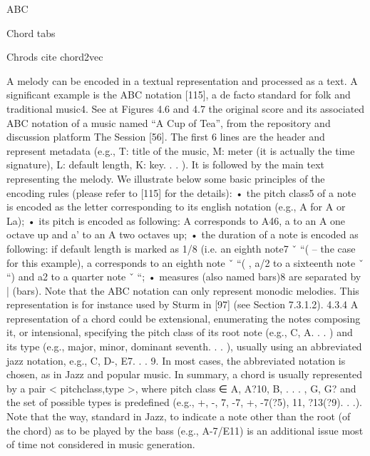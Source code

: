 ABC \cite{Sturm2015}

Chord tabs

Chrods cite chord2vec

A melody can be encoded in a textual representation and processed as a text. A significant example is the ABC notation [115], a de facto standard for folk and traditional music4. See at Figures 4.6 and 4.7 the original score and its associated ABC notation of a music named “A Cup of Tea”, from the repository and discussion platform The Session [56]. The first 6 lines are the header and represent metadata (e.g., T: title of the music, M:
meter (it is actually the time signature), L: default length, K: key. . . ). It is followed by the main text representing the melody. We illustrate below some basic principles of the encoding rules (please refer to [115] for the details):
• the pitch class5 of a note is encoded as the letter corresponding to its english notation (e.g., A for A or La);
• its pitch is encoded as following: A corresponds to A46, a to an A one octave up and a’ to an A two octaves up;
• the duration of a note is encoded as following: if default length is marked as 1/8 (i.e. an eighth note7
ˇ “( – the case for this example), a corresponds to an eighth note ˇ “( , a/2 to a sixteenth note ˇ “) and a2 to a quarter note ˇ “;
• measures (also named bars)8 are separated by | (bars). Note that the ABC notation can only represent monodic melodies. This representation
is for instance used by Sturm in [97] (see Section 7.3.1.2). 4.3.4
A representation of a chord could be extensional, enumerating the notes composing it, or intensional, specifying the pitch class of its root note (e.g., C, A. . . ) and its type (e.g., major, minor, dominant seventh. . . ), usually using an abbreviated jazz notation, e.g., C, D-, E7. . . 9. In most cases, the abbreviated notation is chosen, as in Jazz and popular music. In summary, a chord is usually represented by a pair < pitchclass,type >, where pitch
class ∈ {A, A?10, B, . . . , G, G?} and the set of possible types is predefined (e.g., {+, -, 7, -7, +, -7(?5), 11, ?13(?9). . .}). Note that the way, standard in Jazz, to indicate a note other than the root (of the chord) as to be played by the bass (e.g., A-7/E11) is an additional issue most of time not considered in music generation.

